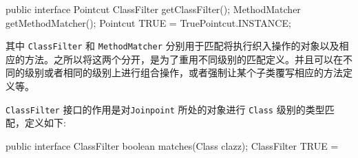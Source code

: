 \begin{Java}
public interface Pointcut {
    ClassFilter getClassFilter();
    MethodMatcher getMethodMatcher();
    Pointcut TRUE = TruePointcut.INSTANCE;
}      
\end{Java}

其中 \texttt{ClassFilter} 和 \texttt{MethodMatcher} 分别用于匹配将执行织入操作的对象以及相应的方法。之所以将这两个分开，是为了重用不同级别的匹配定义。并且可以在不同的级别或者相同的级别上进行组合操作，或者强制让某个子类覆写相应的方法定义等。

\texttt{ClassFilter} 接口的作用是对\texttt{Joinpoint} 所处的对象进行 \texttt{Class} 级别的类型匹配，定义如下:

\begin{Java}
public interface ClassFilter {
    boolean matches(Class clazz);
    ClassFilter TRUE = 
}
\end{Java}










\newpage